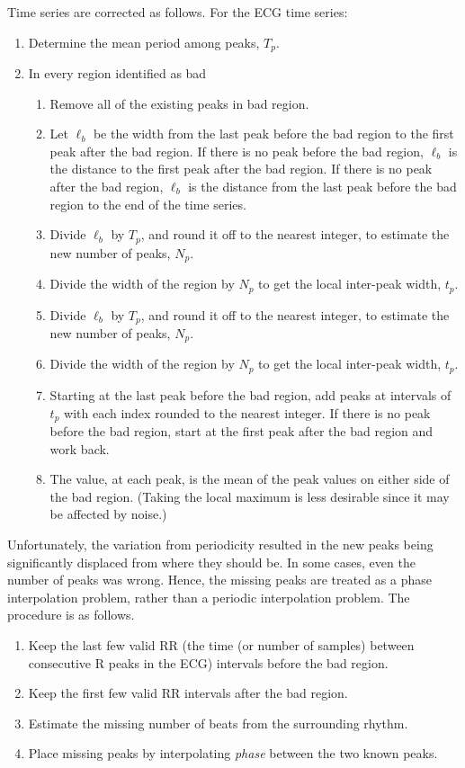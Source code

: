 \documentclass[twoside,twocolumn]{article}
\begin{document}
Time series are corrected as follows.  For the ECG time series:
\begin{enumerate}
	\item Determine the mean period among peaks, $T_p$.
	\item In every region identified as bad
	\begin{enumerate}
		\item Remove all of the existing peaks in bad region.
		\item Let $\ell_b$ be the width from the last peak before the bad region to the first peak after the bad region.  If there is no peak before the bad region, $\ell_b$ is the distance to the first peak after the bad region.  If there is no peak after the bad region, $\ell_b$ is the distance from the last peak before the bad region to the end of the time series.
		\item Divide $\ell_b$ by $T_p$, and round it off to the nearest integer, to estimate the new number of peaks, $N_p$.
		\item Divide the width of the region by $N_p$ to get the local inter-peak width, $t_p$.
		\item Divide $\ell_b$ by $T_p$, and round it off to	the nearest integer, to estimate the new number of peaks, $N_p$.
		\item Divide the width of the region by $N_p$ to get the local inter-peak width, $t_p$.
		\item Starting at the last peak before the bad region, add peaks at intervals of $t_p$ with each index rounded to the nearest integer.  If there is no peak before the bad region, start at the first peak after the bad region and work back.
		\item The value, at each peak, is the mean of the peak values on either side of the bad region.  (Taking the local maximum is less desirable since it may be affected by noise.) 
	\end{enumerate}
\end{enumerate}

Unfortunately, the variation from periodicity resulted in the new peaks being significantly displaced from where they should be.  In some cases, even the number of peaks was wrong.  Hence, the missing peaks are treated as a phase interpolation problem, rather than a periodic interpolation problem.  The procedure is as follows.
\begin{enumerate}
	\item Keep the last few valid RR (the time (or number of samples) between consecutive R peaks in the ECG) intervals before the bad region.
	\item Keep the first few valid RR intervals after the bad region.
	\item Estimate the missing number of beats from the surrounding rhythm.
	\item Place missing peaks by interpolating {\em phase} between the two known peaks.
\end{enumerate}
\end{document}
